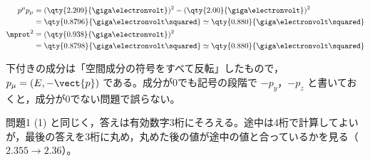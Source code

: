 \begin{align*}
  p^{\mu}p_{\mu}&=(\qty{2.209}{\giga\electronvolt})^{2}-(\qty{2.00}{\giga\electronvolt})^{2}\\
  &=\qty{0.8796}{\giga\electronvolt\squared}\simeq\qty{0.880}{\giga\electronvolt\squared}\\
  \mprot^{2}&=(\qty{0.938}{\giga\electronvolt})^{2}\\
  &=\qty{0.8798}{\giga\electronvolt\squared}\simeq\qty{0.880}{\giga\electronvolt\squared}
\end{align*}
\item 下付きの成分は「空間成分の符号をすべて反転」したもので，$p_{\mu}=(E,-\vect{p})$ である。成分が0でも記号の段階で $-p_{y}$，$-p_{z}$ と書いておくと，成分が0でない問題で誤らない。
\item 問題1 (1) と同じく，答えは有効数字3桁にそろえる。途中は4桁で計算してよいが，最後の答えを3桁に丸め，丸めた後の値が途中の値と合っているかを見る（$2.355\to2.36$）。
